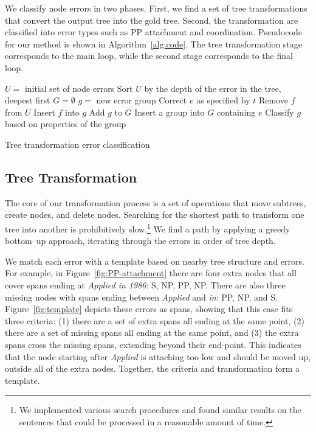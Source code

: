 We classify node errors in two phases.  First, we find a set of tree
transformations that convert the output tree into the gold tree.  Second, the
transformation are classified into error types such as PP attachment and
coordination.  Pseudocode for our method is shown in Algorithm~\ref{alg:code}.
The tree transformation stage corresponds to the main loop, while the second
stage corresponds to the final loop.

\begin{algorithm}[t]
\begin{algorithmic}
\State $U =$ initial set of node errors
\State Sort $U$ by the depth of the error in the tree, deepest first
\State $G = \emptyset$
\Repeat
			\State $g =$ new error group
			\State Correct $e$ as specified by $t$
				\State Remove $f$ from $U$
				\State Insert $f$ into $g$
			\EndFor
			\State Add $g$ to $G$
		\EndIf
	\EndFor
{}
	\State Insert a group into $G$ containing $e$
\EndFor
{}
	\State Classify $g$ based on properties of the group
\EndFor
\end{algorithmic}
\caption{
\label{alg:code}
	Tree transformation error classification
}
\end{algorithm}

\subsection{Tree Transformation}

The core of our transformation process is a set of operations that move
subtrees, create nodes, and delete nodes.  Searching for the shortest path to
transform one tree into another is prohibitively slow.\footnote{We implemented
various search procedures and found similar results on the sentences that could
be processed in a reasonable amount of time.}  We find a path by applying a
greedy bottom--up approach, iterating through the errors in order of tree depth.

We match each error with a template based on nearby tree structure and
errors.  For example, in Figure~\ref{fig:PP-attachment} there are four extra
nodes that all cover spans ending at \emph{Applied in 1986}: S, NP, PP, NP.
There are also three missing nodes with spans ending between \emph{Applied} and
\emph{in}: PP, NP, and S.  Figure~\ref{fig:template} depicts these errors as
spans, showing that this case fits three criteria: (1) there are a set of extra
spans all ending at the same point, (2) there are a set of missing spans all
ending at the same point, and (3) the extra spans cross the missing spans,
extending beyond their end-point.  This indicates that the node starting after
\emph{Applied} is attaching too low and should be moved up, outside all of the
extra nodes.  Together, the criteria and transformation form a template.

